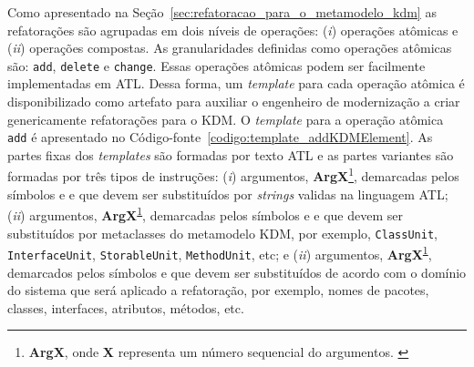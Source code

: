 Como apresentado na Seção~\ref{sec:refatoracao_para_o_metamodelo_kdm} as refatorações são agrupadas em dois níveis de operações: (\textit{i}) operações atômicas e (\textit{ii}) operações compostas. As granularidades definidas como operações atômicas são: \texttt{add}, \texttt{delete} e \texttt{change}. Essas operações atômicas podem ser facilmente implementadas em ATL. Dessa forma, um \textit{template} para cada operação atômica é disponibilizado como artefato para auxiliar o engenheiro de modernização a criar genericamente refatorações para o KDM. O \textit{template} para a operação atômica \texttt{add} é apresentado no Código-fonte~\ref{codigo:template_addKDMElement}. As partes fixas dos \textit{templates} são formadas por texto ATL e as partes variantes são formadas por três tipos de instruções: (\textit{i}) argumentos, \textbf{ArgX}\footnote{\textbf{ArgX}, onde \textbf{X} representa um número sequencial do argumentos. \label{foot:Arg}}, demarcadas pelos símbolos \aspas{\textbf{<\#}} e \aspas{\textbf{\#>}} e que devem ser substituídos por \textit{strings} validas na linguagem ATL; (\textit{ii}) argumentos, \textbf{ArgX}\textsuperscript{\ref{foot:Arg}}, demarcadas pelos símbolos \aspas{\textbf{<\%}} e \aspas{\textbf{\%>}} e que devem ser substituídos por metaclasses do metamodelo KDM, por exemplo, \texttt{ClassUnit}, \texttt{InterfaceUnit}, \texttt{StorableUnit}, \texttt{MethodUnit}, etc; e (\textit{ii}) argumentos, \textbf{ArgX}\textsuperscript{\ref{foot:Arg}}, demarcados pelos símbolos  e  que devem ser substituídos de acordo com o domínio do sistema que será aplicado a refatoração, por exemplo, nomes de pacotes, classes, interfaces, atributos, métodos, etc.  






